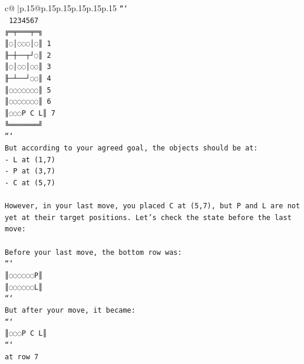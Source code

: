\documentclass{article}
\begin{document}
{\begin{supertabular}{c@{$\;$}|p{.15\linewidth}@{}p{.15\linewidth}p{.15\linewidth}p{.15\linewidth}p{.15\linewidth}p{.15\linewidth}}
{{{\texttt{```} \\
\texttt{ 1234567} \\
\texttt{╔═╤═══╤═╗} \\
\texttt{║◌│◌◌◌│◌║ 1} \\
\texttt{╟─┼──┬┘◌║ 2} \\
\texttt{║◌│◌◌│◌◌║ 3} \\
\texttt{╟─┴──┘◌◌║ 4} \\
\texttt{║◌◌◌◌◌◌◌║ 5} \\
\texttt{║◌◌◌◌◌◌◌║ 6} \\
\texttt{║◌◌◌P C L║ 7} \\
\texttt{╚═══════╝} \\
\texttt{```} \\
\texttt{But according to your agreed goal, the objects should be at:} \\
\texttt{{-} L at (1,7)} \\
\texttt{{-} P at (3,7)} \\
\texttt{{-} C at (5,7)} \\
\\ 
\texttt{However, in your last move, you placed C at (5,7), but P and L are not yet at their target positions. Let's check the state before the last move:} \\
\\ 
\texttt{Before your last move, the bottom row was:} \\
\texttt{```} \\
\texttt{║◌◌◌◌◌◌P║} \\
\texttt{║◌◌◌◌◌◌L║} \\
\texttt{```} \\
\texttt{But after your move, it became:} \\
\texttt{```} \\
\texttt{║◌◌◌P C L║} \\
\texttt{```} \\
\texttt{at row 7} \\
            }
        }
    }
     \\ \\


\end{supertabular}}
\end{document}

